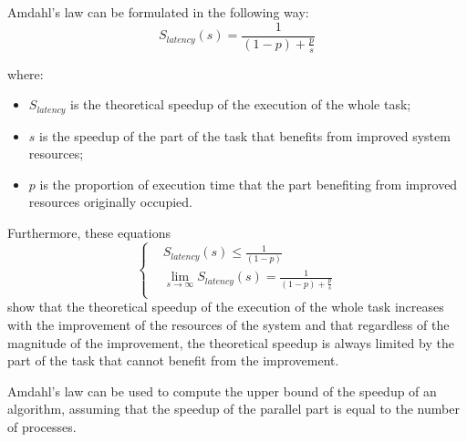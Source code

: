 Amdahl's law can be formulated in the following way:
\begin{equation}
    S_{latency}(s)=\frac{1}{(1-p)+\frac{p}{s}} 
\end{equation}

where:
\begin{itemize}
    \item $S_{latency}$ is the theoretical speedup of the execution of the whole task;
    \item $s$ is the speedup of the part of the task that benefits from improved system resources;
    \item $p$ is the proportion of execution time that the part benefiting from improved resources originally occupied.
\end{itemize}

Furthermore, these equations
\begin{equation}
    \left\{
        \begin{aligned}
            &S_{latency}(s)\leq \frac{1}{(1-p)}  \\
            &\lim_{s \to \infty} S_{latency}(s)= \frac{1}{(1-p)+\frac{p}{s}} \\
        \end{aligned}
    \right.
\end{equation}
show that the theoretical speedup of the execution of the whole task increases with the improvement of the resources of the system and that regardless of the magnitude of the improvement, the theoretical speedup is always limited by the part of the task that cannot benefit from the improvement.

Amdahl's law can be used to compute the upper bound of the speedup of an algorithm, assuming that the speedup of the parallel part is equal to the number of processes.

